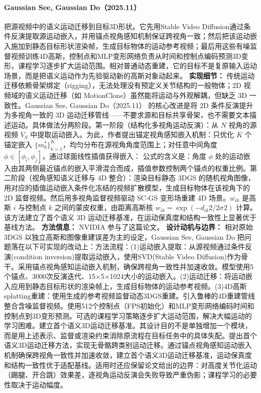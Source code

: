 \paragraph{Gaussian See, Gaussian Do（2025.11）\cite{2511_14848}}
把源视频中的语义运动迁移到目标3D形状。它先用Stable Video Diffusion通过条件反演提取源运动嵌入，并用锚点视角感知机制保证跨视角一致；然后把该运动嵌入施加到静态目标形状渲染帧，生成目标物体的运动参考视频；最后用这些有噪监督视频训练4D高斯，控制点和MLP变形网络负责从时间和控制点编码预测3D变形，课程学习逐步扩大运动范围。相对普通动态重建，它的目标不是复原输入运动场景，而是把语义运动作为先验驱动新的高斯对象动起来。
\textbf{实现细节：} 传统运动迁移依赖骨架绑定（rigging），无法处理没有预定义关节结构的一般物体；2D 视频域的语义运动迁移（如 MotionClone）虽然能将运动与外观解耦，但缺乏 3D 一致性。Gaussian See, Gaussian Do（2025.11） 的核心改进是将 2D 条件反演提升为多视角一致的 3D 运动迁移管线——不要求源和目标共享骨架，也不需要文本描述运动。具体做法分两阶段。第一阶段（结构化多视角运动反演）：从 $N$ 视角的源视频 $V_S$ 中提取运动嵌入。为此，作者提出锚定视角感知嵌入机制：只优化 $K$ 个锚定嵌入 $\{m_k^{*}\}_{k=1}^K$，均匀分布在源视角角度范围上；对任意中间角度 $\phi \in [\phi_i, \phi_j]$，通过球面线性插值获得嵌入： 公式的含义是：角度 $\phi$ 处的运动嵌入由其两侧最近锚点的嵌入平滑混合而成，插值参数控制两个锚点的权重比例。第二阶段（视角感知语义迁移与 4D 整合）：渲染目标静态 3DGS 的随机视角图像，用对应的插值运动嵌入条件化冻结的视频扩散模型，生成目标物体在该视角下的 2D 监督视频。然后用多视角监督视频驱动 SC-GS 变形场重建 4D 场景。$w_{ik}$ 是高斯 $i$ 与控制点 $k$ 之间的蒙皮权重，由距离高斯核 $w_{ik} = \exp(-d_{ik}^{}2 / 2\sigma^{}2)$ 计算。该方法建立了首个语义 3D 运动迁移基准，在运动保真度和结构一致性上显著优于基线方法。
\textbf{方法信息：} NVIDIA 参与了这篇论文。
\textbf{设计动机与边界：} 相对原始 3DGS 以独立高斯和图像重建误差为主的设定，Gaussian See, Gaussian Do 把问题落在以下可实现的改动上：方法流程：(1)运动嵌入提取：从源视频通过条件反演(condition inversion)提取运动嵌入，使用SVD(Stable Video Diffusion)作为骨干。采用锚点视角感知运动嵌入机制，确保跨视角一致性并加速收敛。模型使用5个锚点、3000次反演迭代、15×5×1024大小的运动嵌入。(2)运动迁移：将运动嵌入应用到静态目标形状的渲染帧上，生成目标物体的运动参考视频。(3)4D高斯splatting重建：使用生成的参考视频监督动态3DGS重建。引入鲁棒的4D重建管线整合含噪监督视频。使用512个控制点（FPS初始化）和MLP变形网络编码时间和控制点到3D变形预测。可选的课程学习策略逐步扩大运动范围，解决大幅运动的学习困难。建立首个语义3D运动迁移基准。其设计目的不是单独增加一个模块，而是用上述表示、监督或渲染约束消除原流程在目标任务中的具体失配。提出首个语义3D运动迁移方法，实现无骨骼跨类别运动迁移。通过锚点视角感知运动嵌入机制确保跨视角一致性并加速收敛，建立首个语义3D运动迁移基准，运动保真度和结构一致性优于适配基线。适用时还应保留论文给出的边界：对高度关节化运动（踢腿、开合跳）效果差，逐视角运动反演会失败导致严重伪影；课程学习的必要性取决于运动幅度。
